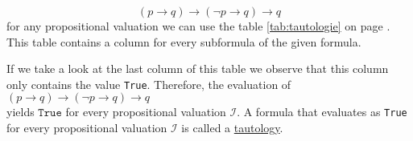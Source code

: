 $$  (p \rightarrow q) \rightarrow (\neg p \rightarrow q) \rightarrow q $$
for any propositional valuation we can use the table \ref{tab:tautologie} on page
\pageref{tab:tautologie}.  This table contains a column for every subformula of the given formula.
\begin{table}[!ht]
  \centering
{}
  \caption{Berechnung der Wahrheitswerte von $(p \rightarrow q) \rightarrow (\neg p \rightarrow q) \rightarrow q$}
  \label{tab:tautologie}
\end{table}
If we take a look at the last column of this table we observe that this column only contains the value
\texttt{True}.  Therefore, the evaluation of 
\\[0.2cm]
\hspace*{1.3cm}
$(p \rightarrow q) \rightarrow (\neg p \rightarrow q) \rightarrow q $
\\[0.2cm]
yields $\mathtt{True}$ for every propositional valuation $\mathcal{I}$.  
A formula that evaluates as \texttt{True} for every propositional valuation $\mathcal{I}$ is called a
\href{https://en.wikipedia.org/wiki/Tautology_(logic)}{tautology}.

